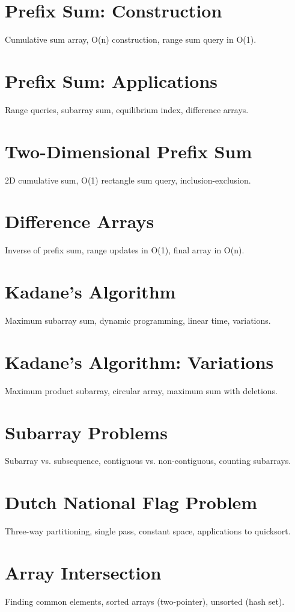 \chapter{Prefix Sum: Construction}
Cumulative sum array, O(n) construction, range sum query in O(1).

\chapter{Prefix Sum: Applications}
Range queries, subarray sum, equilibrium index, difference arrays.

\chapter{Two-Dimensional Prefix Sum}
2D cumulative sum, O(1) rectangle sum query, inclusion-exclusion.

\chapter{Difference Arrays}
Inverse of prefix sum, range updates in O(1), final array in O(n).

\chapter{Kadane's Algorithm}
Maximum subarray sum, dynamic programming, linear time, variations.

\chapter{Kadane's Algorithm: Variations}
Maximum product subarray, circular array, maximum sum with deletions.

\chapter{Subarray Problems}
Subarray vs. subsequence, contiguous vs. non-contiguous, counting subarrays.

\chapter{Dutch National Flag Problem}
Three-way partitioning, single pass, constant space, applications to quicksort.

\chapter{Array Intersection}
Finding common elements, sorted arrays (two-pointer), unsorted (hash set).

